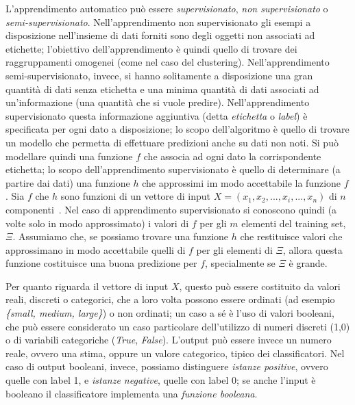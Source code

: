 \documentclass[oneside, openany]{book}
\begin{document}
		L'apprendimento automatico può essere \textit{supervisionato}, \textit{non supervisionato} o \textit{semi-supervisionato}. Nell'apprendimento non supervisionato gli esempi a disposizione nell'insieme di dati forniti sono degli oggetti non associati ad etichette; l'obiettivo dell'apprendimento è quindi quello di trovare dei raggruppamenti omogenei (come nel caso del clustering). Nell'apprendimento semi-supervisionato, invece, si hanno solitamente a disposizione una gran quantità di dati senza etichetta e una minima quantità di dati associati ad un'informazione (una quantità che si vuole predire).
		Nell'apprendimento supervisionato questa informazione aggiuntiva (detta \textit{etichetta} o \textit{label}) è specificata per ogni dato a disposizione; lo scopo dell'algoritmo è quello di trovare un modello che permetta di effettuare predizioni anche su dati non noti.
		Si può modellare quindi una funzione $f$ che associa ad ogni dato la corrispondente etichetta; lo scopo dell'apprendimento supervisionato è quello di determinare (a partire dai dati) una funzione $h$ che approssimi im modo accettabile la funzione $f$. Sia $f$ che $h$ sono funzioni di un vettore di input $X=(x_1,x_2,...,x_i,...,x_n)$ di $n$ componenti~\cite{bib:ml}.
		Nel caso di apprendimento supervisionato si conoscono quindi (a volte solo in modo approssimato) i valori di $f$ per gli $m$ elementi del training set, $\Xi$. Assumiamo che, se possiamo trovare una funzione $h$ che restituisce valori che approssimano in modo accettabile quelli di $f$ per gli elementi di $\Xi$, allora questa funzione costituisce una buona predizione per $f$, specialmente se $\Xi$ è grande.
		
		Per quanto riguarda il vettore di input $X$, questo può essere costituito da valori reali, discreti o categorici, che a loro volta possono essere ordinati (ad esempio \textit{\{small, medium, large\}}) o non ordinati; un caso a sé è l'uso di valori booleani, che può essere considerato un caso particolare dell'utilizzo di numeri discreti (1,0) o di variabili categoriche (\textit{True}, \textit{False}).\newline
		L'output può essere invece un numero reale, ovvero una stima, oppure un valore categorico, tipico dei classificatori. Nel caso di output booleani, invece, possiamo distinguere \textit{istanze positive}, ovvero quelle con label 1, e \textit{istanze negative}, quelle con label 0; se anche l'input è booleano il classificatore implementa una \textit{funzione booleana}.\\
		
\end{document}
